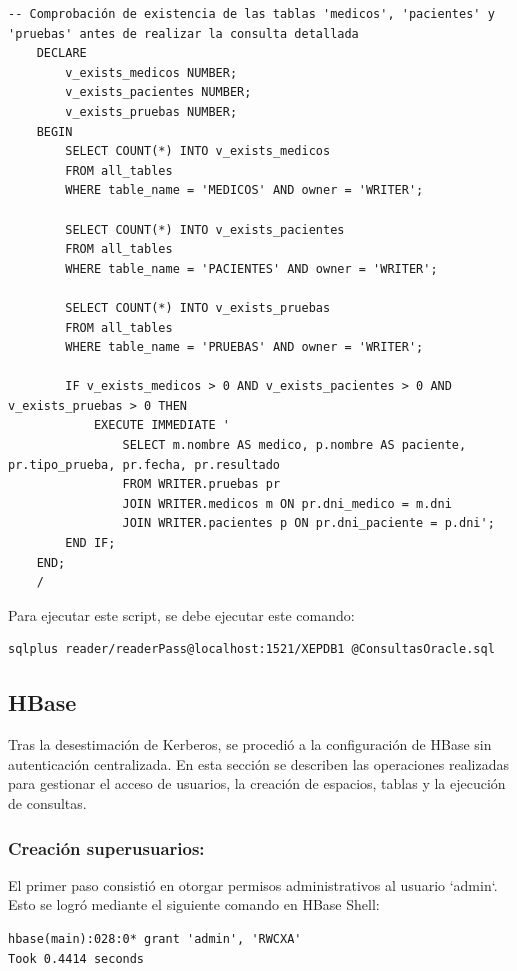 \documentclass{article}
\begin{document}
\begin{lstlisting}[style=bashStyle]
    -- Comprobación de existencia de las tablas 'medicos', 'pacientes' y 'pruebas' antes de realizar la consulta detallada
    DECLARE
        v_exists_medicos NUMBER;
        v_exists_pacientes NUMBER;
        v_exists_pruebas NUMBER;
    BEGIN
        SELECT COUNT(*) INTO v_exists_medicos
        FROM all_tables
        WHERE table_name = 'MEDICOS' AND owner = 'WRITER';
    
        SELECT COUNT(*) INTO v_exists_pacientes
        FROM all_tables
        WHERE table_name = 'PACIENTES' AND owner = 'WRITER';
    
        SELECT COUNT(*) INTO v_exists_pruebas
        FROM all_tables
        WHERE table_name = 'PRUEBAS' AND owner = 'WRITER';
    
        IF v_exists_medicos > 0 AND v_exists_pacientes > 0 AND v_exists_pruebas > 0 THEN
            EXECUTE IMMEDIATE '
                SELECT m.nombre AS medico, p.nombre AS paciente, pr.tipo_prueba, pr.fecha, pr.resultado
                FROM WRITER.pruebas pr
                JOIN WRITER.medicos m ON pr.dni_medico = m.dni
                JOIN WRITER.pacientes p ON pr.dni_paciente = p.dni';
        END IF;
    END;
    /
\end{lstlisting}

Para ejecutar este script, se debe ejecutar este comando:
\begin{lstlisting}[style=bashStyle]
sqlplus reader/readerPass@localhost:1521/XEPDB1 @ConsultasOracle.sql
\end{lstlisting}


\subsection{HBase}

Tras la desestimación de Kerberos, se procedió a la configuración de HBase sin autenticación centralizada. En esta sección se describen las operaciones realizadas para gestionar el acceso de usuarios, la creación de espacios, tablas y la ejecución de consultas.

\subsubsection{Creación superusuarios:}
El primer paso consistió en otorgar permisos administrativos al usuario `admin`. Esto se logró mediante el siguiente comando en HBase Shell:

\begin{lstlisting}[style=bashStyle]
hbase(main):028:0* grant 'admin', 'RWCXA'
Took 0.4414 seconds
\end{lstlisting}
\end{document}
